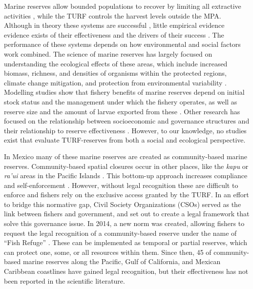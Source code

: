 \documentclass{frontiersSCNS}
\begin{document}
Marine reserves allow bounded populations to recover by limiting all
extractive activities \citep{halpern_2002}, while the TURF controls the
harvest levels outside the MPA. Although in theory these systems are
successful \citep{costello_2010-Ix}, little empirical evidence evidence
exists of their effectiveness and the drivers of their success
\citep{afflerbach_2014-HP,lester_2017}. The performance of these systems
depends on how environmental and social factors work combined. The
science of marine reserves has largely focused on understanding the
ecological effects of these areas, which include increased biomass,
richness, and densities of organisms within the protected regions,
climate change mitigation, and protection from environmental variability
\citep{lester_2009-Ks,giakoumi_2017-V2,sala_2017-69,roberts_2017-J9,micheli_2012-EU}.
Modelling studies show that fishery benefits of marine reserves depend
on initial stock status and the management under which the fishery
operates, as well as reserve size and the amount of larvae exported from
these \citep{hilborn_2006,krueck_2017-J1}. Other research has focused on
the relationship between socioeconomic and governance structures and
their relationship to reserve effectiveness
\citep{halpern_2013,lpezangarita_2014,mascia_2017-m_}. However, to our
knowledge, no studies exist that evaluate TURF-reserves from both a
social and ecological perspective.

In Mexico many of these marine reserves are created as community-based
marine reserves. Community-based spatial closures occur in other places,
like the \emph{kapu} or \emph{ra'ui} areas in the Pacific Islands
\citep{bohnsack_2004,johannes_2002}. This bottom-up approach increases
compliance and self-enforcement
\citep{gelcich_2015-Gw,espinosaromero_2014-PY,beger_2004-Y8}. However,
without legal recognition these are difficult to enforce and fishers
rely on the exclusive access granted by the TURF. In an effort to bridge
this normative gap, Civil Society Organizations (CSOs) served as the
link between fishers and government, and set out to create a legal
framework that solve this governance issue. In 2014, a new norm was
created, allowing fishers to request the legal recognition of a
community-based reserve under the name of ``Fish Refuge'' \citep{nom}.
These can be implemented as temporal or partial reserves, which can
protect one, some, or all resources within them. Since then, 45 of
community-based marine reserves along the Pacific, Gulf of California,
and Mexican Caribbean coastlines have gained legal recognition, but
their effectiveness has not been reported in the scientific literature.
\end{document}
